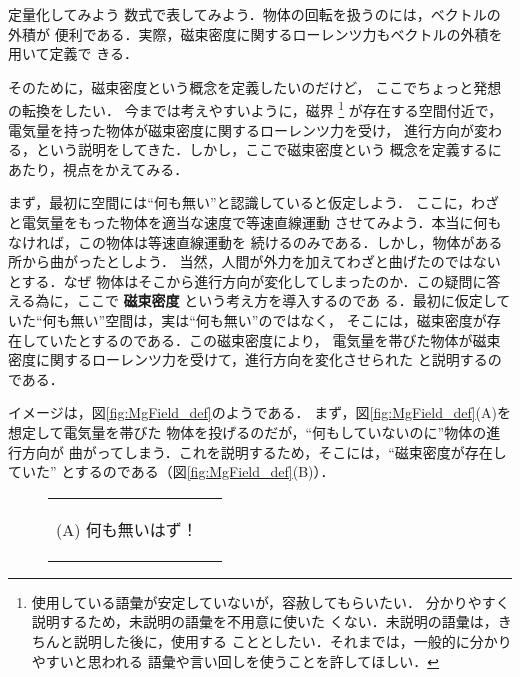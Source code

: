     \begin{mysmallsec}{定量化してみよう}
        数式で表してみよう．物体の回転を扱うのには，ベクトルの外積が
        便利である．実際，磁束密度に関するローレンツ力もベクトルの外積を用いて定義で
        きる．

        そのために，磁束密度という概念を定義したいのだけど，
        ここでちょっと発想の転換をしたい．
        今までは考えやすいように，磁界
            \footnote{
                使用している語彙が安定していないが，容赦してもらいたい．
                分かりやすく説明するため，未説明の語彙を不用意に使いた
                くない．未説明の語彙は，きちんと説明した後に，使用する
                こととしたい．それまでは，一般的に分かりやすいと思われる
                語彙や言い回しを使うことを許してほしい．
            }
        が存在する空間付近で，電気量を持った物体が磁束密度に関するローレンツ力を受け，
        進行方向が変わる，という説明をしてきた．しかし，ここで磁束密度という
        概念を定義するにあたり，視点をかえてみる．

        まず，最初に空間には“何も無い”と認識していると仮定しよう．
        ここに，わざと電気量をもった物体を適当な速度で等速直線運動
        させてみよう．本当に何もなければ，この物体は等速直線運動を
        続けるのみである．しかし，物体がある所から曲がったとしよう．
        当然，人間が外力を加えてわざと曲げたのではないとする．なぜ
        物体はそこから進行方向が変化してしまったのか．この疑問に答
        える為に，ここで \textbf{磁束密度} という考え方を導入するのであ
        る．最初に仮定していた“何も無い”空間は，実は“何も無い”のではなく，
        そこには，磁束密度が存在していたとするのである．この磁束密度により，
        電気量を帯びた物体が磁束密度に関するローレンツ力を受けて，進行方向を変化させられた
        と説明するのである．

        イメージは，図\ref{fig:MgField_def}のようである．
        まず，図\ref{fig:MgField_def}(A)を想定して電気量を帯びた
        物体を投げるのだが，“何もしていないのに”物体の進行方向が
        曲がってしまう．これを説明するため，そこには，“磁束密度が存在していた”
        とするのである（図\ref{fig:MgField_def}(B)）．
        \begin{figure}[hbt]
            \begin{tabular}{cc}
                \begin{minipage}{0.5\hsize}
                    \begin{center}
                        {MgField_01.pdf}

                        (A) 何も無いはず！
                    \end{center}
                \end{minipage}
                \begin{minipage}{0.5\hsize}
                    \begin{center}
                        {MgField_02.pdf}


\end{center}
\end{minipage}
\end{tabular}
\end{figure}
\end{mysmallsec}
